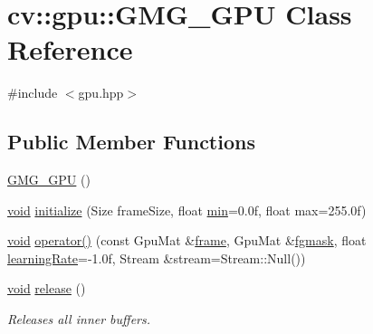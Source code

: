 \hypertarget{classcv_1_1gpu_1_1GMG__GPU}{\section{cv\-:\-:gpu\-:\-:G\-M\-G\-\_\-\-G\-P\-U Class Reference}
\label{classcv_1_1gpu_1_1GMG__GPU}
}


{\ttfamily \#include $<$gpu.\-hpp$>$}

\subsection*{Public Member Functions}
\begin{DoxyCompactItemize}
\item 
\hyperlink{classcv_1_1gpu_1_1GMG__GPU_ad82da60216a396d784e00e9b26f34a11}{G\-M\-G\-\_\-\-G\-P\-U} ()
\item 
\hyperlink{legacy_8hpp_a8bb47f092d473522721002c86c13b94e}{void} \hyperlink{classcv_1_1gpu_1_1GMG__GPU_a2e1c627dfcea6f7a896eb00a207aad74}{initialize} (Size frame\-Size, float \hyperlink{namespacecv_1_1gpu_a8d100341ab11a730a3c90b75d5890a8c}{min}=0.\-0f, float max=255.\-0f)
\item 
\hyperlink{legacy_8hpp_a8bb47f092d473522721002c86c13b94e}{void} \hyperlink{classcv_1_1gpu_1_1GMG__GPU_a2268e960d6273ce783224552eca213b6}{operator()} (const Gpu\-Mat \&\hyperlink{core__c_8h_a0430deaafd9043e478f306e33961299d}{frame}, Gpu\-Mat \&\hyperlink{legacy_8hpp_a7ff9edf5eaa300d3c1cea7de20631fd8}{fgmask}, float \hyperlink{classcv_1_1gpu_1_1GMG__GPU_a05dad91a91ad2a893a79f0b95920e24c}{learning\-Rate}=-\/1.\-0f, Stream \&stream=\-Stream\-::\-Null())
\item 
\hyperlink{legacy_8hpp_a8bb47f092d473522721002c86c13b94e}{void} \hyperlink{classcv_1_1gpu_1_1GMG__GPU_aece33d6bceadab91fa10934820c1105b}{release} ()
\begin{DoxyCompactList}\small\item\em Releases all inner buffers. \end{DoxyCompactList}\end{DoxyCompactItemize}

